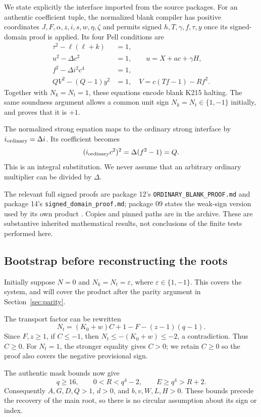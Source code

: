 \documentclass[11pt]{article}
\theoremstyle{remark}\newtheorem{remark}[theorem]{Remark}
\begin{document}
We state explicitly the interface imported from the source packages.
For an authentic coefficient tuple, the normalized blank compiler has
positive coordinates \(J,F,\alpha,z,i,s,w,\eta,\zeta\) and permits
signed \(h,T,\gamma,f,\tau,y\) once its signed-domain proof is applied.
Its four Pell conditions are
\begin{align}
 \tau^2-\ell(\ell+k)&=1,\label{eq:first}\\
 u^2-\Delta c^2&=1,\qquad u=X+ac+\gamma H,\label{eq:mainnorm}\\
 f^2-\Delta i^2c^4&=1,\label{eq:strong}\\
 QV^2-(Q-1)y^2&=1,\quad
 V=c(Tf-1)-Rf^2.\label{eq:aux}
\end{align}
Together with \(N_k=N_t=1\), these equations encode blank K215
halting. The same soundness argument allows a common unit sign
\(N_k=N_t\in\{1,-1\}\) initially, and proves that it is \(+1\).

The normalized strong equation maps to the ordinary strong interface
by \(i_{\rm ordinary}=\Delta i\). Its coefficient becomes
\[
 (i_{\rm ordinary}c^2)^2
   =\Delta(f^2-1)=Q.
\]
This is an integral substitution. We never assume that an arbitrary
ordinary multiplier can be divided by \(\Delta\).

The relevant full signed proofs are package 12's
\texttt{ORDINARY\_BLANK\_PROOF.md} and package 14's
\texttt{signed\_domain\_proof.md}; package 09 states the weak-sign
version used by its own product \cite{p09,p12,p14}. Copies and pinned paths are in the
archive. These are substantive inherited mathematical results,
not conclusions of the finite tests performed here.

\subsection{Bootstrap before reconstructing the roots}

Initially suppose \(N=0\) and \(N_k=N_t=\varepsilon\), where
\(\varepsilon\in\{1,-1\}\). This covers the system, and will cover
the product after the parity argument in Section~\ref{sec:parity}.

The transport factor can be rewritten
\[
 N_t=(K_0+w)C+1-F-(z-1)(q-1).
\]
Since \(F,z\ge1\), if \(C\le-1\), then
\(N_t\le-(K_0+w)\le-2\), a contradiction. Thus \(C\ge0\).
For \(N_t=1\), the stronger equality gives \(C>0\); we retain
\(C\ge0\) so the proof also covers the negative provisional sign.

The authentic mask bounds now give
\[
 q\ge16,\qquad 0<R<q^4-2,\qquad E\ge q^4>R+2.
\]
Consequently \(A,G,D,Q>1\), \(d>0\), and \(b,v,W,L,H>0\).
These bounds precede the recovery of the main root, so there is no
circular assumption about its sign or index.
\end{document}
